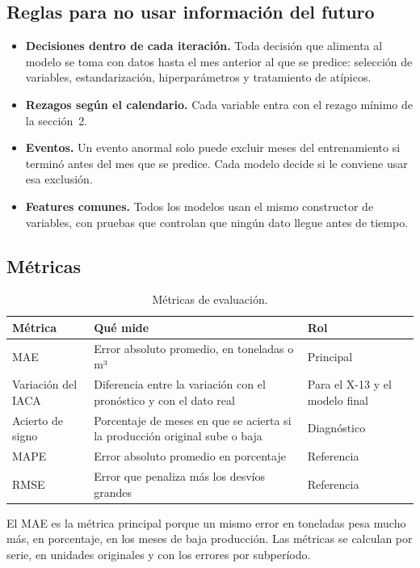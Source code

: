 \documentclass[11pt,a4paper]{article}
\begin{document}
\subsection{Reglas para no usar información del futuro}

\begin{itemize}
  \item \textbf{Decisiones dentro de cada iteración.} Toda decisión que alimenta al modelo se toma con datos hasta el mes anterior al que se predice: selección de variables, estandarización, hiperparámetros y tratamiento de atípicos.
  \item \textbf{Rezagos según el calendario.} Cada variable entra con el rezago mínimo de la sección~2.
  \item \textbf{Eventos.} Un evento anormal solo puede excluir meses del entrenamiento si terminó antes del mes que se predice. Cada modelo decide si le conviene usar esa exclusión.
  \item \textbf{Features comunes.} Todos los modelos usan el mismo constructor de variables, con pruebas que controlan que ningún dato llegue antes de tiempo.
\end{itemize}

\subsection{Métricas}

\begin{table}[htbp]
\centering\small
\begin{tabularx}{\textwidth}{@{}P{3.1cm}LP{3.6cm}@{}}
\toprule
\textbf{Métrica} & \textbf{Qué mide} & \textbf{Rol}\\
\midrule
MAE & Error absoluto promedio, en toneladas o m³ & Principal\\
Variación del IACA & Diferencia entre la variación con el pronóstico y con el dato real & Para el X-13 y el modelo final\\
Acierto de signo & Porcentaje de meses en que se acierta si la producción original sube o baja & Diagnóstico\\
MAPE & Error absoluto promedio en porcentaje & Referencia\\
RMSE & Error que penaliza más los desvíos grandes & Referencia\\
\bottomrule
\end{tabularx}
\caption{Métricas de evaluación.}
\end{table}

El MAE es la métrica principal porque un mismo error en toneladas pesa mucho más, en porcentaje, en los meses de baja producción. Las métricas se calculan por serie, en unidades originales y con los errores por subperíodo.
\end{document}
